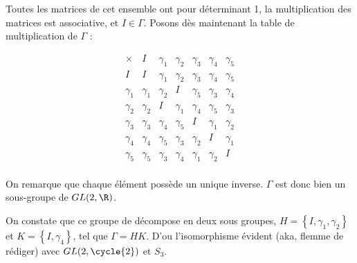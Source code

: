 Toutes les matrices de cet ensemble ont pour déterminant 1, la multiplication des matrices est associative, et $I \in \Gamma$. Posons dès maintenant la table de multiplication de $\Gamma$ :


\[
  \begin{array}{c|cccccc}
    \times   & I        & \gamma_1 & \gamma_2 & \gamma_3 & \gamma_4 & \gamma_5 \\
    \hline
    I        & I        & \gamma_1 & \gamma_2 & \gamma_3 & \gamma_4 & \gamma_5 \\
    \gamma_1 & \gamma_1 & \gamma_2 & I        & \gamma_5 & \gamma_3 & \gamma_4 \\
    \gamma_2 & \gamma_2 & I        & \gamma_1 & \gamma_4 & \gamma_5 & \gamma_3 \\
    \gamma_3 & \gamma_3 & \gamma_4 & \gamma_5 & I        & \gamma_1 & \gamma_2 \\
    \gamma_4 & \gamma_4 & \gamma_5 & \gamma_3 & \gamma_2 & I        & \gamma_1 \\
    \gamma_5 & \gamma_5 & \gamma_3 & \gamma_4 & \gamma_1 & \gamma_2 & I        \\
  \end{array}
\]

On remarque que chaque élément possède un unique inverse. $\Gamma$ est donc bien un sous-groupe de $GL(2,\R)$.

On constate que ce groupe de décompose en deux sous groupes, $H = \left\{I, \gamma_1, \gamma_2 \right\}$ et $K = \left\{ I, \gamma_4  \right\}$, tel que $\Gamma = HK$. 
D'ou l'isomorphisme évident (aka, flemme de rédiger) avec $GL(2,\cycle{2})$ et $S_3$.